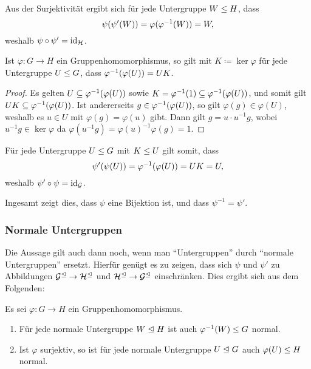Aus der Surjektivität ergibt sich für jede Untergruppe $W \leq H$, dass
\[
    \psi(\psi'(W))
  = \varphi( \varphi^{-1}(W) )
  = W,
\]
weshalb $\psi \circ \psi' = \operatorname{id}_{\mathcal{H}}$.

\begin{lemma}
  Ist $\varphi \colon G \to H$ ein Gruppenhomomorphismus, so gilt mit $K \coloneqq \ker \varphi$ für jede Untergruppe $U \leq G$, dass $\varphi^{-1}(\varphi(U)) = UK$.
\end{lemma}

\begin{proof}
  Es gelten $U \subseteq \varphi^{-1}(\varphi(U))$ sowie $K = \varphi^{-1}(1) \subseteq \varphi^{-1}(\varphi(U))$, und somit gilt $U K \subseteq \varphi^{-1}(\varphi(U))$.
  Ist andererseits $g \in \varphi^{-1}(\varphi(U))$, so gilt $\varphi(g) \in \varphi(U)$, weshalb es $u \in U$ mit $\varphi(g) = \varphi(u)$ gibt.
  Dann gilt $g = u \cdot u^{-1} g$, wobei $u^{-1} g \in \ker \varphi$ da $\varphi(u^{-1} g) = \varphi(u)^{-1} \varphi(g) = 1$.
\end{proof}

Für jede Untergruppe $U \leq G$ mit $K \leq U$ gilt somit, dass
\[
    \psi'(\psi(U))
  = \varphi^{-1}(\varphi(U))
  = UK
  = U,
\]
weshalb $\psi' \circ \psi = \operatorname{id}_{\mathcal{G}}$.

Ingesamt zeigt dies, dass $\psi$ eine Bijektion ist, und dass $\psi^{-1} = \psi'$.





\subsubsection*{Normale Untergruppen}

Die Aussage gilt auch dann noch, wenn man \enquote{Untergruppen} durch \enquote{normale Untergruppen} ersetzt.
Hierfür genügt es zu zeigen, dass sich $\psi$ und $\psi'$ zu Abbildungen $\mathcal{G}^\trianglelefteq \to \mathcal{H}^\trianglelefteq$ und $\mathcal{H}^\trianglelefteq \to \mathcal{G}^\trianglelefteq$ einschränken.
Dies ergibt sich aus dem Folgenden:

\begin{lemma}
  Es sei $\varphi \colon G \to H$ ein Gruppenhomomorphismus.
  \begin{enumerate}
    \item
      Für jede normale Untergruppe $W \trianglelefteq H$ ist auch $\varphi^{-1}(W) \leq G$ normal.
    \item
      Ist $\varphi$ surjektiv, so ist für jede normale Untergruppe $U \trianglelefteq G$ auch $\varphi(U) \leq H$ normal.
  \end{enumerate}
\end{lemma}

